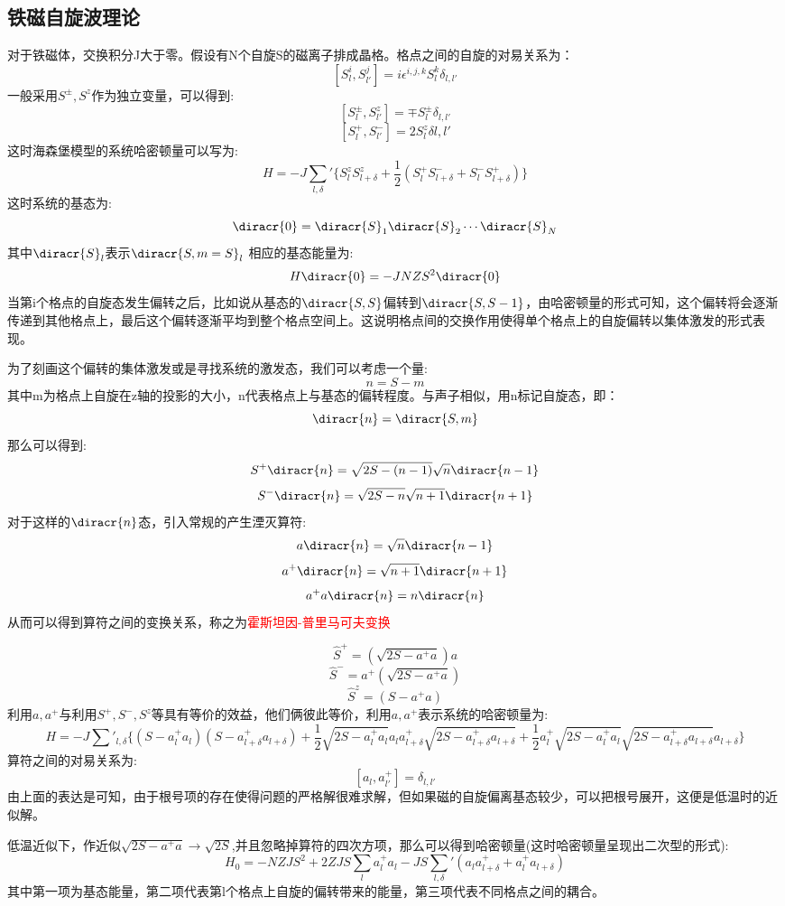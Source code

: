 \subsection{铁磁自旋波理论}
对于铁磁体，交换积分J大于零。假设有N个自旋S的磁离子排成晶格。格点之间的自旋的对易关系为：
\[[S_l^i,S_{l'}^j]=i\epsilon^{i,j,k}S_l^k\delta_{l,l'}\]
一般采用$S^{\pm},S^z$作为独立变量，可以得到:
\[[S_l^{\pm},S_{l'}^z]=\mp S_l^{\pm}\delta_{l,l'}\]
\[[S_l^+,S_{l'}^-]=2S_{l}^z\delta{l,l'}\]
这时海森堡模型的系统哈密顿量可以写为:
\[H=-J\sum_{l,\delta}'\{S_l^zS_{l+\delta}^z+\frac{1}{2}(S_l^+S_{l+\delta}^-+S_l^-S_{l+\delta}^+)\}\]
这时系统的基态为:
\[\diracr{0}=\diracr{S}_1\diracr{S}_2\cdots \diracr{S}_N\]
其中$\diracr{S}_l$表示$\diracr{S,m=S}_l$
相应的基态能量为:
\[H\diracr{0}=-JNZS^2\diracr{0}\]
当第i个格点的自旋态发生偏转之后，比如说从基态的$\diracr{S,S}$偏转到$\diracr{S,S-1}$，由哈密顿量的形式可知，这个偏转将会逐渐传递到其他格点上，最后这个偏转逐渐平均到整个格点空间上。这说明格点间的交换作用使得单个格点上的自旋偏转以集体激发的形式表现。\par
为了刻画这个偏转的集体激发或是寻找系统的激发态，我们可以考虑一个量:
\[n=S-m\]
其中m为格点上自旋在z轴的投影的大小，n代表格点上与基态的偏转程度。与声子相似，用n标记自旋态，即：
\[\diracr{n}=\diracr{S,m}\]
那么可以得到:
\[S^+\diracr{n}=\sqrt{2S-(n-1)}\sqrt{n}\diracr{n-1}\]
\[S^-\diracr{n}=\sqrt{2S-n}\sqrt{n+1}\diracr{n+1}\]
对于这样的$\diracr{n}$态，引入常规的产生湮灭算符:
\[a\diracr{n}=\sqrt{n}\diracr{n-1}\]
\[a^+\diracr{n}=\sqrt{n+1}\diracr{n+1}\]
\[a^+a\diracr{n}=n\diracr{n}\]
从而可以得到算符之间的变换关系，称之为\textcolor{red}{霍斯坦因-普里马可夫变换}\par
\[\hat{S}^+=(\sqrt{2S-a^+a})a\]
\[\hat{S}^-=a^+(\sqrt{2S-a^+a})\]
\[\hat{S}^z=(S-a^+a)\]
利用$a,a^+$与利用$S^+,S^-,S^z$等具有等价的效益，他们俩彼此等价，利用$a,a^+$表示系统的哈密顿量为:
\[H=-J\sum'_{l,\delta} \{(S-a_l^+a_l)(S-a_{l+\delta}^+a_{l+\delta})+\frac{1}{2}\sqrt{2S-a_l^+a_l}a_la_{l+\delta}^+\sqrt{2S-a_{l+\delta}^+a_{l+\delta}}+\frac{1}{2}a_l^+\sqrt{2S-a_l^+a_l}\sqrt{2S-a_{l+\delta}^+a_{l+\delta}}a_{l+\delta}\}\]
算符之间的对易关系为:
\[[a_l,a_{l'}^+]=\delta_{l,l'}\]
由上面的表达是可知，由于根号项的存在使得问题的严格解很难求解，但如果磁的自旋偏离基态较少，可以把根号展开，这便是低温时的近似解。\par
低温近似下，作近似$\sqrt{2S-a^+a}\rightarrow \sqrt{2S}$,并且忽略掉算符的四次方项，那么可以得到哈密顿量(这时哈密顿量呈现出二次型的形式):
\[H_0=-NZJS^2+2ZJS\sum_la_l^+a_l-JS\sum_{l,\delta}'(a_la_{l+\delta}^++a_l^+a_{l+\delta})\]
其中第一项为基态能量，第二项代表第l个格点上自旋的偏转带来的能量，第三项代表不同格点之间的耦合。\par
